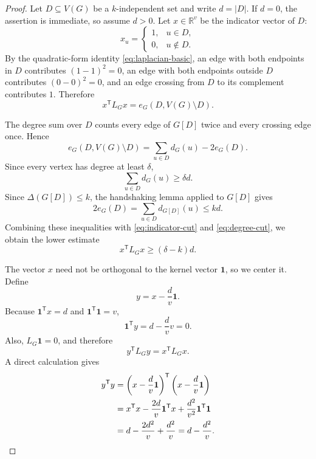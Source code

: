 \documentclass[11pt]{article}
\theoremstyle{definition}
\newcommand{\ind}{\mathbf{1}}
\begin{document}
\begin{proof}
Let $D\subseteq V(G)$ be a $k$-independent set and write $d=|D|$.  If
$d=0$, the assertion is immediate, so assume $d>0$.  Let $x\in\mathbb R^v$
be the indicator vector of $D$:
\[
  x_u=
  \begin{cases}
  1,&u\in D,\\
  0,&u\notin D.
  \end{cases}
\]
By the quadratic-form identity \eqref{eq:laplacian-basic}, an edge with both
endpoints in $D$ contributes $(1-1)^2=0$, an edge with both endpoints
outside $D$ contributes $(0-0)^2=0$, and an edge crossing from $D$ to its
complement contributes $1$.  Therefore
\begin{equation}\label{eq:indicator-cut}
  x^{\mathsf T}L_Gx=e_G(D,V(G)\setminus D).
\end{equation}

The degree sum over $D$ counts every edge of $G[D]$ twice and every crossing
edge once.  Hence
\begin{equation}\label{eq:degree-cut}
  e_G(D,V(G)\setminus D)
  =\sum_{u\in D}d_G(u)-2e_G(D).
\end{equation}
Since every vertex has degree at least $\delta$,
\[
  \sum_{u\in D}d_G(u)\ge\delta d.
\]
Since $\Delta(G[D])\le k$, the handshaking lemma applied to $G[D]$ gives
\[
  2e_G(D)=\sum_{u\in D}d_{G[D]}(u)\le kd.
\]
Combining these inequalities with \eqref{eq:indicator-cut} and
\eqref{eq:degree-cut}, we obtain the lower estimate
\begin{equation}\label{eq:cut-lower}
  x^{\mathsf T}L_Gx\ge(\delta-k)d.
\end{equation}

The vector $x$ need not be orthogonal to the kernel vector $\ind$, so we
center it.  Define
\[
  y=x-\frac{d}{v}\ind.
\]
Because $\ind^{\mathsf T}x=d$ and
$\ind^{\mathsf T}\ind=v$,
\[
  \ind^{\mathsf T}y=d-\frac{d}{v}v=0.
\]
Also, $L_G\ind=0$, and therefore
\begin{equation}\label{eq:centered-energy}
  y^{\mathsf T}L_Gy=x^{\mathsf T}L_Gx.
\end{equation}
A direct calculation gives
\begin{align}
 y^{\mathsf T}y
 &=\left(x-\frac{d}{v}\ind\right)^{\mathsf T}
   \left(x-\frac{d}{v}\ind\right)\notag\\
 &=x^{\mathsf T}x-\frac{2d}{v}\ind^{\mathsf T}x
   +\frac{d^2}{v^2}\ind^{\mathsf T}\ind\notag\\
 &=d-\frac{2d^2}{v}+\frac{d^2}{v}
 =d-\frac{d^2}{v}.                                         \label{eq:centered-norm}
\end{align}


\end{proof}
\end{document}
